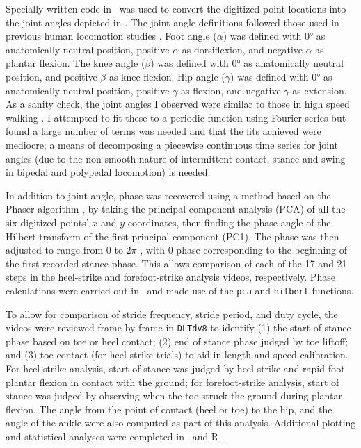 Specially written code in \Matlab\ was used to convert the digitized point locations into the joint angles depicted in . The joint angle definitions followed those used in previous human locomotion studies \citep{qiao2016leg, giandolini2013impact, larson2014comparison, hamner2010muscle, liu2008muscle, dickinson1985measurement, mcmahon1984muscles}. Foot angle ($\alpha$) was defined with \ang{0} as anatomically neutral position, positive $\alpha$ as dorsiflexion, and negative $\alpha$ as plantar flexion. The knee angle ($\beta$) was defined with \ang{0} as anatomically neutral position, and positive $\beta$ as knee flexion. Hip angle ($\gamma$) was defined with \ang{0} as anatomically neutral position, positive $\gamma$ as flexion, and negative $\gamma$ as extension. As a sanity check, the joint angles I observed were similar to those in high speed walking \citep{liu2008muscle}. I attempted to fit these to a periodic function using Fourier series but found a large number of terms was needed and that the fits achieved were mediocre; a means of decomposing a piecewise continuous time series for joint angles (due to the non-smooth nature of intermittent contact, stance and swing in bipedal and polypedal locomotion) is needed. 

In addition to joint angle, phase was recovered using a method based on the Phaser algorithm \citep{revzen2008estimating}, by taking the principal component analysis (PCA) of all the six digitized points' $x$ and $y$ coordinates, then finding the phase angle of the Hilbert transform of the first principal component (PC1). The phase was then adjusted to range from 0 to $2\pi$ \citep{revzen2009towards}, with 0 phase corresponding to the beginning of the first recorded stance phase. This allows comparison of each of the 17 and 21 steps in the heel-strike and forefoot-strike analysis videos, respectively. Phase calculations were carried out in \Matlab\ and made use of the \lstinline{pca} and \lstinline{hilbert} functions. 

To allow for comparison of stride frequency, stride period, and duty cycle, the videos were reviewed frame by frame in \lstinline{DLTdv8} to identify (1) the start of stance phase based on toe or heel contact; (2) end of stance phase judged by toe liftoff; and (3) toe contact (for heel-strike trials) to aid in length and speed calibration.  For heel-strike analysis, start of stance was judged by heel-strike and rapid foot plantar flexion in contact with the ground; for forefoot-strike analysis, start of stance was judged by observing when the toe struck the ground during plantar flexion. The angle from the point of contact (heel or toe) to the hip, and the angle of the ankle were also computed as part of this analysis. Additional plotting and statistical analyses were completed in \Matlab\ and R \citep{r2020}. 

